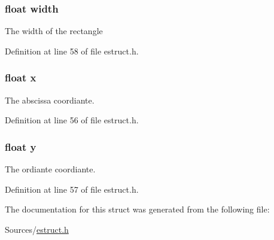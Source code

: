 \hypertarget{struct__rect_ae426f00e82704fa09578f5446e22d915}{
\subsubsection[{width}]{\setlength{\rightskip}{0pt plus 5cm}float width}}\label{struct__rect_ae426f00e82704fa09578f5446e22d915}
The width of the rectangle 

Definition at line 58 of file estruct.\-h.

\hypertarget{struct__rect_ad0da36b2558901e21e7a30f6c227a45e}{
\subsubsection[{x}]{\setlength{\rightskip}{0pt plus 5cm}float x}}\label{struct__rect_ad0da36b2558901e21e7a30f6c227a45e}
The abscissa coordiante. 

Definition at line 56 of file estruct.\-h.

\hypertarget{struct__rect_aa4f0d3eebc3c443f9be81bf48561a217}{
\subsubsection[{y}]{\setlength{\rightskip}{0pt plus 5cm}float y}}\label{struct__rect_aa4f0d3eebc3c443f9be81bf48561a217}
The ordiante coordiante. 

Definition at line 57 of file estruct.\-h.



The documentation for this struct was generated from the following file\-:\begin{DoxyCompactItemize}
\item 
Sources/\hyperlink{estruct_8h}{estruct.\-h}\end{DoxyCompactItemize}
